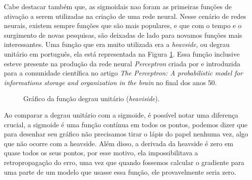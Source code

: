 Cabe destacar também que, as sigmoidais nao foram as primeiras funções de ativação a serem utilizadas na criação de uma rede neural. Nesse cenário de redes neurais, existem sempre funções que são mais populares, e que com o tempo e o surgimento de novas pesquisas, são deixadas de lado para novamos funções mais interessantes. Uma função que era muito utilizada era a \textit{heavside}, ou degrau unitário em português, ela está representada na Figura \ref{fig:degrau-unitario}. Essa função inclusive esteve presente na produção da rede neural \textit{Perceptron} criada por \textcite{PerceptronRosenblatt} e introduzida para a comunidade científica no artigo \textit{The Perceptron: A probabilistic model for informations storage and organization in the brain} no final dos anos 50.

\begin{figure}[h!]
    \centering
    \caption{Gráfico da função degrau unitário (\textit{heaviside}).}
    \label{fig:degrau-unitario}
\end{figure}

Ao comparar a degrau unitário com a sigmoide, é possível notar uma diferença crucial, a sigmoide é uma função contínua em todos os pontos, podemos dizer que para desenhar seu gráfico não precisamos tirar o lápis do papel nenhuma vez, algo que não ocorre com a heavside. Além disso, a derivada da heavside é zero em quase todos os seus pontos, por esse motivo, ela impossibilitava a retropropagação do erro, uma vez que quando fossemos calcular o gradiente para uma parte de um modelo que usasse essa função, ele provavelmente seria zero.

